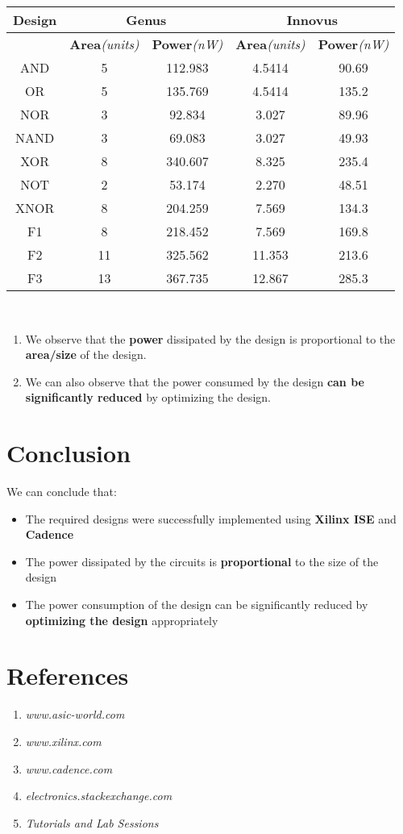 \documentclass[a4paper,11pt]{report}
\begin{document}
\begin{tabular}{|c|c|c|c|c|}
  \hline
   \textbf{Design} & \multicolumn{2}{|c|}{\textbf{Genus}} & \multicolumn{2}{|c|}{\textbf{Innovus}} \\
   \hline
    & \textbf{Area}\textit{(units)} & \textbf{Power}\textit{(nW)} & \textbf{Area}\textit{(units)} & \textbf{Power}\textit{(nW)} \\
    \hline
    AND & 5 & 112.983 &  4.5414  & 90.69  \\
    \hline
    OR & 5 & 135.769 & 4.5414 & 135.2 \\
    \hline
    NOR & 3 & 92.834 & 3.027 & 89.96 \\
    \hline
    NAND & 3 & 69.083 & 3.027 & 49.93\\
    \hline
    XOR & 8 & 340.607 & 8.325 & 235.4\\
    \hline
    NOT & 2 & 53.174 & 2.270 & 48.51\\
    \hline
    XNOR & 8 & 204.259 & 7.569 & 134.3\\
    \hline
    F1 & 8 & 218.452 & 7.569 & 169.8\\
    \hline
    F2 & 11 & 325.562 & 11.353 & 213.6 \\
    \hline
    F3 & 13 & 367.735 & 12.867 & 285.3 \\
    \hline

\end{tabular} \\

\begin{enumerate}
\item We observe that the \textbf{power} dissipated by the design is proportional to the \textbf{area/size} of the design. 
\item We can also observe that the power consumed by the design \textbf{can be significantly reduced} by optimizing the design.

\end{enumerate}

\section{Conclusion}

We can conclude that:
\begin{itemize}
\item The required designs were successfully implemented using \textbf{Xilinx ISE} and \textbf{Cadence}
\item The power dissipated by the circuits is \textbf{proportional} to the size of the design
\item The power consumption of the design can be significantly reduced by \textbf{optimizing the design} appropriately
\end{itemize}

\section{References}
\begin{enumerate}
\item \textit{www.asic-world.com}
\item \textit{www.xilinx.com}
\item \textit{www.cadence.com}
\item \textit{electronics.stackexchange.com}
\item \textit{Tutorials and Lab Sessions}
\end{enumerate}
\end{document}
